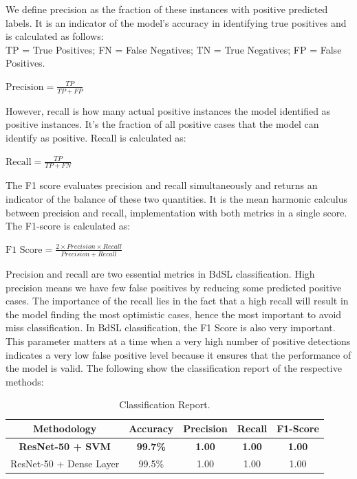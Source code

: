 We define precision as the fraction of these instances with positive predicted labels. It is an indicator of the model's accuracy in identifying true positives and is calculated as follows:\\

TP = True Positives; FN = False Negatives; TN = True Negatives; FP = False Positives.

\begin{center}
$\text{Precision} = \frac{TP}{TP + FP}$
\end{center}

However, recall is how many actual positive instances the model identified as positive instances. It's the fraction of all positive cases that the model can identify as positive. Recall is calculated as: 

\begin{center}
    $\text{Recall} = \frac{TP}{TP + FN}$
\end{center}

The F1 score evaluates precision and recall simultaneously and returns an indicator of the balance of these two quantities. It is the mean harmonic calculus between precision and recall, implementation with both metrics in a single score. The F1-score is calculated as:

\begin{center}
    $\text{F1 Score} = \frac{2 \times Precision \times Recall}{Precision + Recall}$
\end{center}

Precision and recall are two essential metrics in BdSL classification. High precision means we have few false positives by reducing some predicted positive cases. The importance of the recall lies in the fact that a high recall will result in the model finding the most optimistic cases, hence the most important to avoid miss classification. In BdSL classification, the F1 Score is also very important. This parameter matters at a time when a very high number of positive detections indicates a very low false positive level because it ensures that the performance of the model is valid. The following show the classification report of the respective methods:

\vspace{8mm}
\begin{table}[h]
\centering
\begin{tabular}{|c|c|c|c|c|}
\hline
\textbf{Methodology} & \textbf{Accuracy} & \textbf{Precision} & \textbf{Recall} & \textbf{F1-Score} \\
\hline
\textbf{ResNet-50 + SVM} & \textbf{99.7\%} & \textbf{1.00} & \textbf{1.00} & \textbf{1.00} \\
\hline
ResNet-50 + Dense Layer & 99.5\% & 1.00 & 1.00 & 1.00 \\
\hline
\end{tabular}
\caption{Classification Report.}
\label{tab:classification_report}
\end{table}

